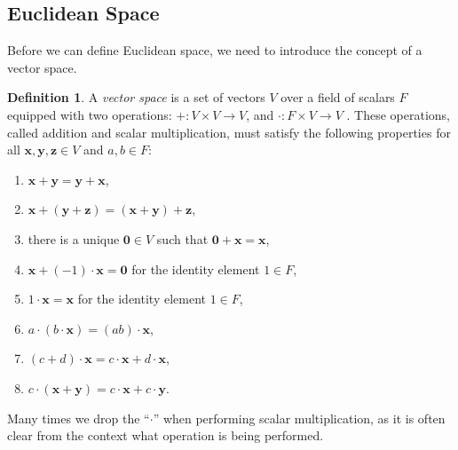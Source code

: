 \documentclass{article}
\newcommand{\x}{\mathbf{x}}
\newcommand{\y}{\mathbf{y}}
\newcommand{\z}{\mathbf{z}}
\newcommand{\ze}{\mathbf{0}}
\theoremstyle{definition}
\newtheorem{definition}{Definition}[section]
\begin{document}
	\subsection{Euclidean Space}
	Before we can define Euclidean space, we need to introduce the concept of a vector space. 
	\begin{definition}
		A \textit{\color{red}vector space} is a set of vectors $ V $ over a field of scalars $ F $ equipped with two operations: $ +:V\times V\to V $, and $ \cdot:F\times V\to V $ . These operations, called addition and scalar multiplication, must satisfy the following properties for all $ \x,\y,\mathbf{z}\in V $ and $ a,b\in F $:
		\begin{enumerate}
			\item $ \x+\y=\y+\x $,
			\item $ \x+(\y+\z)=(\x+\y)+\z $,
			\item there is a unique $ \mathbf{0}\in V $ such that $ \ze+\x=\x $,
			\item $ \x+(-1)\cdot\x=\ze $ for the identity element $ 1\in F $,
			\item $ 1\cdot\x=\x $ for the identity element $ 1\in F $,
			\item $ a\cdot(b\cdot\x)=(ab)\cdot\x $,
			\item $ (c+d)\cdot\x=c\cdot\x+d\cdot\x $,
			\item $ c\cdot(\x+\y)=c\cdot\x+c\cdot\y $.
		\end{enumerate}
	\end{definition}
	Many times we drop the ``$ \cdot $'' when performing scalar multiplication, as it is often clear from the context what operation is being performed. 
	
\end{document}
